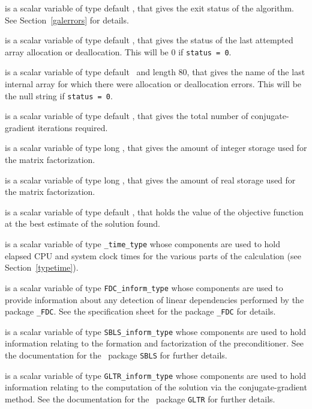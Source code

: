 \begin{description}

 is a scalar variable of type default \integer, that gives the
exit status of the algorithm.
See Section~\ref{galerrors}
for details.

 is a scalar variable of type default \integer, that gives
the status of the last attempted array allocation or deallocation.
This will be 0 if {\tt status = 0}.

 is a scalar variable of type default \character\
and length 80, that  gives the name of the last internal array
for which there were allocation or deallocation errors.
This will be the null string if {\tt status = 0}.

 is a scalar variable of type default \integer, that gives the
total number of conjugate-gradient iterations required.

 is a scalar variable of type long
\integer, that gives the amount of integer storage used for the matrix
factorization.

 is a scalar variable of type long \integer,
that gives the amount of real storage used for the matrix factorization.

 is a scalar variable of type default \realdp, that holds the
value of the objective function at the best estimate of the solution found.

 is a scalar variable of type {\tt \packagename\_time\_type}
whose components are used to hold elapsed CPU and system clock times for the
various parts of the calculation (see Section~\ref{typetime}).

 is a scalar variable of type {\tt FDC\_inform\_type}
whose components are used to provide information about any detection of linear
dependencies performed by the package {\tt \libraryname\_FDC}. See the
specification sheet for the package {\tt \libraryname\_FDC} for details.

 is a scalar variable of type {\tt SBLS\_inform\_type}
whose components are used to hold information relating to the
formation and factorization of the preconditioner. See the
documentation for the \galahad\ package {\tt SBLS} for further details.

 is a scalar variable of type {\tt GLTR\_inform\_type}
whose components are used to hold information relating to the
computation of the solution via the conjugate-gradient method. See the
documentation for the \galahad\ package {\tt GLTR} for further details.

\end{description}
